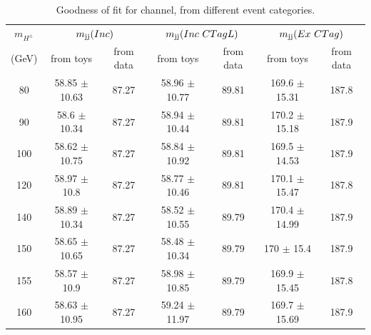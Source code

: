 \begin{table}
\caption{Goodness of fit for \ljets channel, from different event categories.}
\label{tab:gofLep}
\centering
\begin{adjustbox}{max width=\textwidth}
\begin{tabular}{ ccccccc}
\hline
\hline
\multicolumn{1}{c}{{\bf{$m_{H^\pm}$}}} & \multicolumn{2}{c}{$m_\text{jj}(Inc)$} & \multicolumn{2}{c}{$m_\text{jj}(Inc ~CTagL)$} & \multicolumn{2}{c}{$m_\text{jj}(Ex ~CTag)$} \\

(GeV) & from toys & from data & from toys & from data & from toys & from data  \\
 \hline
\hline
80  & 58.85 $\pm$ 10.63 & 87.27 & 58.96 $\pm$ 10.77 & 89.81 & 169.6 $\pm$ 15.31 & 187.8\\
  
90  & 58.6 $\pm$ 10.34 & 87.27 & 58.94 $\pm$ 10.44 & 89.81 & 170.2 $\pm$ 15.18 & 187.9\\
  
100  & 58.62 $\pm$ 10.75 & 87.27 & 58.84 $\pm$ 10.92 & 89.81 & 169.5 $\pm$ 14.53 & 187.9\\
  
120  & 58.97 $\pm$ 10.8 & 87.27 & 58.77 $\pm$ 10.46 & 89.81 & 170.1 $\pm$ 15.47 & 187.8\\
  
140  & 58.89 $\pm$ 10.34 & 87.27 & 58.52 $\pm$ 10.55 & 89.79 & 170.4 $\pm$ 14.99 & 187.9\\
  
150  & 58.65 $\pm$ 10.65 & 87.27 & 58.48 $\pm$ 10.34 & 89.79 & 170 $\pm$ 15.4 & 187.9\\
  
155  & 58.57 $\pm$ 10.9 & 87.27 & 58.98 $\pm$ 10.85 & 89.79 & 169.9 $\pm$ 15.45 & 187.8\\
  
160  & 58.63 $\pm$ 10.95 & 87.27 & 59.24 $\pm$ 11.97 & 89.79 & 169.7 $\pm$ 15.69 & 187.9\\
\hline
\end{tabular}
\end{adjustbox}
\end{table}



